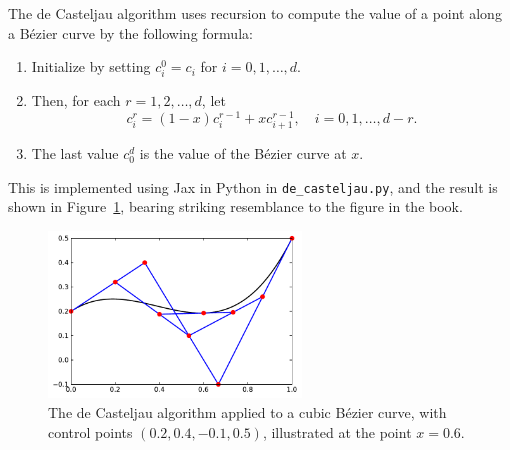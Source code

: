 \begin{solution}
    The de Casteljau algorithm uses recursion to compute the value of a point along a Bézier curve by the following formula:
    \begin{enumerate}
        \item Initialize by setting $c_i^0 = c_i$ for $i = 0, 1, \ldots, d$.
        \item Then, for each $r = 1, 2, \ldots, d$, let
            \begin{equation*}
                c_i^r = (1 - x) c_i^{r-1} + x c_{i+1}^{r-1},
                \quad i = 0, 1, \ldots, d - r.
            \end{equation*}
        \item The last value $c_0^d$ is the value of the Bézier curve at $x$.
    \end{enumerate}

    This is implemented using Jax in Python in \verb|de_casteljau.py|, and the result is shown in Figure~\ref{fig:de_casteljau}, bearing striking resemblance to the figure in the book.
    \begin{figure}[!h]
        \centering
        \includegraphics[width=0.6\textwidth]{1_bb_poly/de_casteljau.pdf}
        \caption{The de Casteljau algorithm applied to a cubic Bézier curve, with control points $(0.2, 0.4, -0.1, 0.5)$, illustrated at the point $x = 0.6$.\label{fig:de_casteljau}}
    \end{figure}
\end{solution}